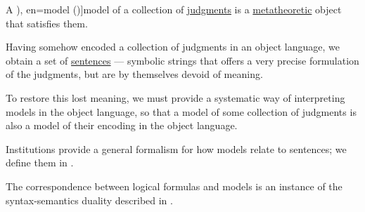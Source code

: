 \begin{concept}\label{con:logical_model}
  A \term[ru=модель (\cite[71]{КолмогоровДрагалин2006Логика}), en=model (\cite[25]{Kleene1971Metamathematics})]{model} of a collection of \hyperref[con:judgment]{judgments} is a \hyperref[con:metalogic]{metatheoretic} object that satisfies them.

  Having somehow encoded a collection of judgments in an object language, we obtain a set of \hyperref[con:proposition]{sentences} --- symbolic strings that offers a very precise formulation of the judgments, but are by themselves devoid of meaning.

  To restore this lost meaning, we must provide a systematic way of interpreting models in the object language, so that a model of some collection of judgments is also a model of their encoding in the object language.

  Institutions provide a general formalism for how models relate to sentences; we define them in .
\end{concept}
\begin{comments}
  \item The correspondence between logical formulas and models is an instance of the syntax-semantics duality described in .
\end{comments}

